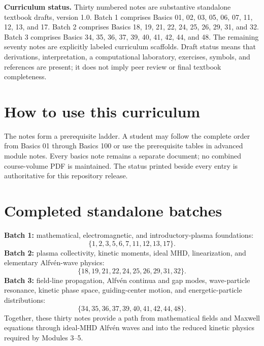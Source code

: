 \documentclass[11pt]{article}
\begin{document}

\begin{overviewbox}
\textbf{Curriculum status.} Thirty numbered notes are substantive standalone textbook drafts, version 1.0. Batch 1 comprises Basics 01, 02, 03, 05, 06, 07, 11, 12, 13, and 17. Batch 2 comprises Basics 18, 19, 21, 22, 24, 25, 26, 29, 31, and 32. Batch 3 comprises Basics 34, 35, 36, 37, 39, 40, 41, 42, 44, and 48. The remaining seventy notes are explicitly labeled curriculum scaffolds. Draft status means that derivations, interpretation, a computational laboratory, exercises, symbols, and references are present; it does not imply peer review or final textbook completeness.
\end{overviewbox}

\ProjectTOC

\section{How to use this curriculum}
The notes form a prerequisite ladder. A student may follow the complete order from Basics 01 through Basics 100 or use the prerequisite tables in advanced module notes. Every basics note remains a separate document; no combined course-volume PDF is maintained. The status printed beside every entry is authoritative for this repository release.

\section{Completed standalone batches}
\textbf{Batch 1:} mathematical, electromagnetic, and introductory-plasma foundations:
\begin{equation*}\{1,2,3,5,6,7,11,12,13,17\}.\end{equation*}
\textbf{Batch 2:} plasma collectivity, kinetic moments, ideal MHD, linearization, and elementary Alfv\'en-wave physics:
\begin{equation*}\{18,19,21,22,24,25,26,29,31,32\}.\end{equation*}
\textbf{Batch 3:} field-line propagation, Alfv\'en continua and gap modes, wave-particle resonance, kinetic phase space, guiding-center motion, and energetic-particle distributions:
\begin{equation*}\{34,35,36,37,39,40,41,42,44,48\}.\end{equation*}
Together, these thirty notes provide a path from mathematical fields and Maxwell equations through ideal-MHD Alfv\'en waves and into the reduced kinetic physics required by Modules 3--5.
\end{document}
